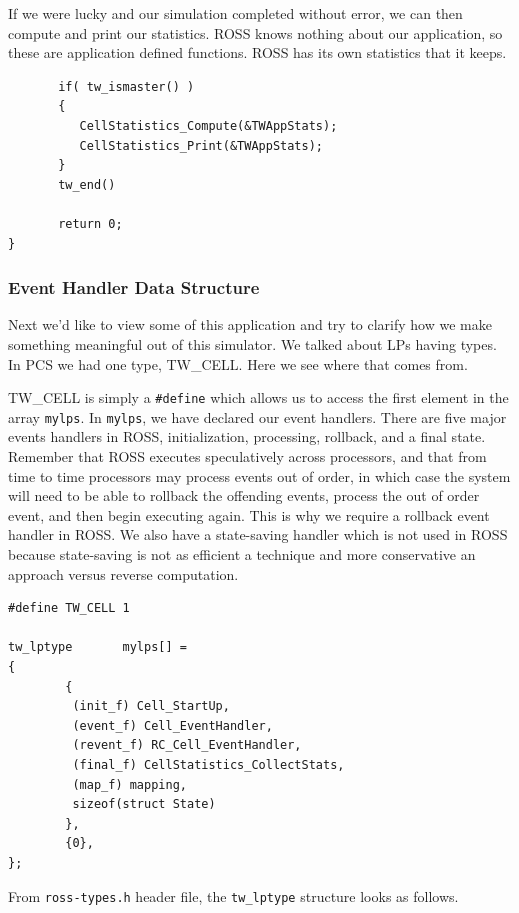 \documentclass[12pt]{article}
\begin{document}
If we were lucky and our simulation completed without error, we can then
compute and print our statistics.  ROSS knows nothing about our application,
so these are application defined functions.  ROSS has its own statistics that
it keeps.

\begin{verbatim}
       if( tw_ismaster() )
       {
          CellStatistics_Compute(&TWAppStats);
          CellStatistics_Print(&TWAppStats);
       }
       tw_end()

       return 0;
}
\end{verbatim}
 
\subsubsection{Event Handler Data Structure}
Next we'd like to view some of this application and try to clarify how we make
something meaningful out of this simulator.  We talked about LPs having types.
In PCS we had one type, TW\_CELL.  Here we see where that comes from.

TW\_CELL is simply a {\tt \#define} which allows us to access the first
element in the array {\tt mylps}.  In {\tt mylps}, we have declared our event
handlers.  There are five major events handlers in ROSS, initialization,
processing, rollback, and a final state.  Remember that ROSS executes
speculatively across processors, and that from time to time processors may
process events out of order, in which case the system will need to be able to
rollback the offending events, process the out of order event, and then begin
executing again.  This is why we require a rollback event handler in ROSS.  We
also have a state-saving handler which is not used in ROSS because
state-saving is not as efficient a technique and more conservative an approach
versus reverse computation.

\begin{verbatim}
#define TW_CELL 1

tw_lptype       mylps[] =
{
        {
         (init_f) Cell_StartUp,
         (event_f) Cell_EventHandler,
         (revent_f) RC_Cell_EventHandler,
         (final_f) CellStatistics_CollectStats,
         (map_f) mapping,
         sizeof(struct State)
        },
        {0},
};

\end{verbatim}

From {\tt ross-types.h} header file, the {\tt tw\_lptype} structure
looks as follows.
\end{document}
